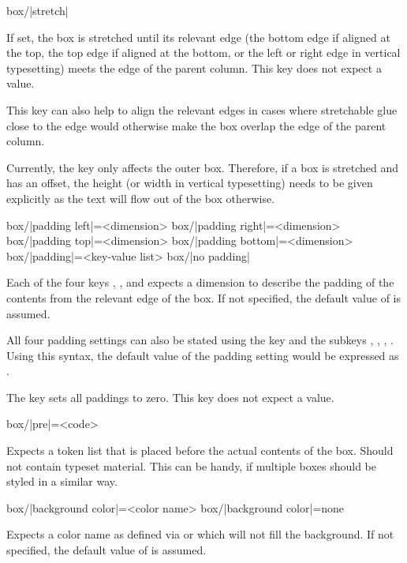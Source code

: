 \documentclass[a4paper]{article}
\begin{document}
\begin{macrodef}
box/|stretch|
\end{macrodef}
If set, the box is stretched until its relevant edge (the bottom edge if aligned at the top, the top edge if aligned at the bottom, or the left or right edge in vertical typesetting) meets the edge of the parent column. This key does not expect a value.

This key can also help to align the relevant edges in cases where stretchable glue close to the edge would otherwise make the box overlap the edge of the parent column.

\warning Currently, the  key only affects the outer box. Therefore, if a box is stretched and has an offset, the height (or width in vertical typesetting) needs to be given explicitly as the text will flow out of the box otherwise.

\begin{macrodef}
box/|padding left|={<dimension>}
box/|padding right|={<dimension>}
box/|padding top|={<dimension>}
box/|padding bottom|={<dimension>}
box/|padding|={<key-value list>}
box/|no padding|
\end{macrodef}
Each of the four keys , ,  and \newline {} expects a dimension to describe the padding of the contents from the relevant edge of the box. If not specified, the default value of \macro{7.5mm} is assumed.

All four padding settings can also be stated using the  key and the subkeys , , , . Using this syntax, the default value of the padding setting would be expressed as .

The key  sets all paddings to zero. This key does not expect a value.

\begin{macrodef}
box/|pre|={<code>}
\end{macrodef}
Expects a token list that is placed before the actual contents of the box. Should not contain typeset material. This can be handy, if multiple boxes should be styled in a similar way.

\begin{macrodef}
box/|background color|={<color name>}
box/|background color|={none}
\end{macrodef}
Expects a color name as defined via  or  which will not fill the background. If not specified, the default value of  is assumed.
\end{document}
